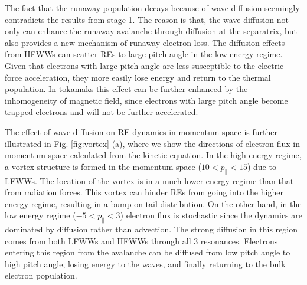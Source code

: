 \documentclass[aps, prl, preprint,english,superscriptaddress]{revtex4-1}
\begin{document}
The fact that the runaway population decays because of wave diffusion seemingly contradicts the results from stage 1. The reason is that, the wave diffusion not only can enhance the runaway avalanche through diffusion at the separatrix, but also provides a new mechanism of runaway electron loss. The diffusion effects from HFWWs can scatter REs to large pitch angle in the low energy regime. Given that electrons with large pitch angle are less susceptible to the electric force acceleration,
they more easily lose energy and return to the thermal population. In tokamaks this effect can be further enhanced by the inhomogeneity of magnetic field, since electrons with large pitch angle become trapped electrons and will not be further accelerated\cite{nilsson_trapped-electron_2015}.

The effect of wave diffusion on RE dynamics in momentum space is further illustrated in Fig. \ref{fig:vortex} (a), where we show the directions of electron flux in momentum space calculated from the kinetic equation. In the high energy regime, a vortex structure is formed in the momentum space ($10<p_\parallel<15$) due to LFWWs. The location of the vortex is in a much lower energy regime than that from radiation forces\cite{guo_phase-space_2017}. This vortex can hinder REs from going into the higher energy regime, resulting in a bump-on-tail distribution. On the other hand, in the low energy regime ($-5<p_\parallel<3$) electron flux is stochastic since the dynamics are dominated by diffusion rather than advection. The strong diffusion in this region comes from both LFWWs and HFWWs through all 3 resonances. Electrons entering this region from the avalanche can be diffused from low pitch angle to high pitch angle, losing energy to the waves, and finally returning to the bulk electron population.
\end{document}
